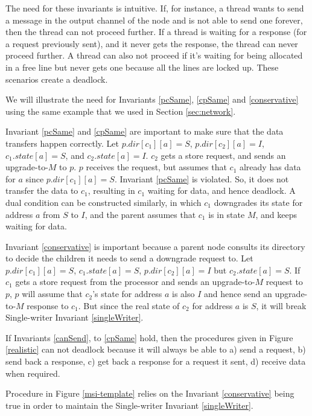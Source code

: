 The need for these invariants is intuitive. If, for instance, a thread wants to
send a message in the output channel of the node and is not able to send one
forever, then the thread can not proceed further. If a thread is waiting for a
response (for a request previously sent), and it never gets the response, the
thread can never proceed further. A thread can also not proceed if it's waiting
for being allocated in a free line but never gets one because all the lines are
locked up. These scenarios create a deadlock.

We will illustrate the need for Invariants \ref{pcSame}, \ref{cpSame} and
\ref{conservative} using the same example that we used in Section
\ref{sec:network}.

Invariant \ref{pcSame} and \ref{cpSame} are important to make sure that the data
transfers happen correctly. Let $p.dir[c_1][a] = S$, $p.dir[c_2][a] = I$,
$c_1.state[a] = S$, and $c_2.state[a] = I$. $c_2$ gets a store request, and
sends an upgrade-to-$M$ to $p$. $p$ receives the request, but assumes that
$c_1$ already has data for $a$ since $p.dir[c_1][a] = S$. Invariant \ref{pcSame}
is violated. So, it does not transfer the data to $c_1$, resulting in $c_1$
waiting for data, and hence deadlock. A dual condition can be constructed
similarly, in which $c_1$ downgrades its state for address $a$ from $S$ to $I$,
and the parent assumes that $c_1$ is in state $M$, and keeps waiting for data.

Invariant \ref{conservative} is important because a parent node consults its
directory to decide the children it needs to send a downgrade request to.  Let
$p.dir[c_1][a] = S$, $c_1.state[a] = S$, $p.dir[c_2][a] = I$ but
$c_2.state[a] = S$. If $c_1$ gets a store request from the processor and sends
an upgrade-to-$M$ request to $p$, $p$ will assume that $c_2$'s state for address $a$
is also $I$ and hence send an upgrade-to-$M$ response to $c_1$. But since the real
state of  $c_2$ for address $a$ is $S$, it will break Single-writer Invariant
\ref{singleWriter}.

If Invariants \ref{canSend}, to \ref{cpSame} hold, then the procedures given
in Figure \ref{realistic} can not deadlock because it will always be able to a)
send a request, b) send back a response, c) get back a response for a request
it sent, d) receive data when required.

Procedure \uReq{} in Figure \ref{msi-template} relies on the Invariant
\ref{conservative} being true in order to maintain the Single-writer Invariant
\ref{singleWriter}.

